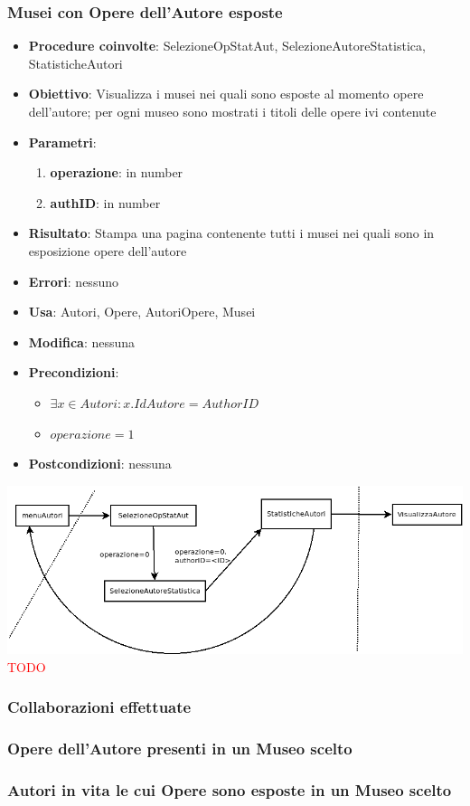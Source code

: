 \subsubsection{Musei con Opere dell’Autore esposte}
\begin{itemize}
	\item \textbf{Procedure coinvolte}: SelezioneOpStatAut, SelezioneAutoreStatistica, StatisticheAutori
	\item \textbf{Obiettivo}: Visualizza i musei nei quali sono esposte al momento opere dell'autore; per ogni museo sono mostrati i titoli delle opere ivi contenute
	\item \textbf{Parametri}:
	\begin{enumerate}
		\item \textbf{operazione}: in number
		\item \textbf{authID}: in number
	\end{enumerate}
	\item \textbf{Risultato}: Stampa una pagina contenente tutti i musei nei quali sono in esposizione opere dell'autore
	\item \textbf{Errori}: nessuno
	\item \textbf{Usa}: Autori, Opere, AutoriOpere, Musei
	\item \textbf{Modifica}: nessuna
	\item \textbf{Precondizioni}:
	\begin{itemize}
		\item $\exists x \in Autori : x.IdAutore = AuthorID$
		\item $operazione  = 1$
	\end{itemize}
	\item \textbf{Postcondizioni}: nessuna
\end{itemize}
\includegraphics[width=\textwidth]{img/statAutori-0.png}\\[1cm]

\textcolor{red}{\Huge TODO}

\subsubsection{Collaborazioni effettuate}
\subsubsection{Opere dell’Autore presenti in un Museo scelto}
\subsubsection{Autori in vita le cui Opere sono esposte in un Museo scelto}